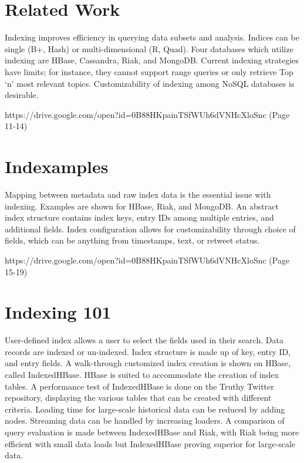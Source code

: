 \section{Related Work}

Indexing improves efficiency in querying data subsets and analysis.
Indices can be single (B+, Hash) or multi-dimensional (R, Quad). Four
databases which utilize indexing are HBase, Cassandra, Riak, and
MongoDB. Current indexing strategies have limits; for instance, they
cannot support range queries or only retrieve Top `n' most relevant
topics. Customizability of indexing among NoSQL databases is desirable.


{https://drive.google.com/open?id=0B88HKpainTSfWUh6dVNHcXloSnc
  (Page 11-14)}

\section{Indexamples}

Mapping between metadata and raw index data is the essential issue with
indexing. Examples are shown for HBase, Riak, and MongoDB. An abstract
index structure contains index keys, entry IDs among multiple entries,
and additional fields. Index configuration allows for customizability
through choice of fields, which can be anything from timestamps, text,
or retweet status.


{https://drive.google.com/open?id=0B88HKpainTSfWUh6dVNHcXloSnc
  (Page 15-19)}

\section{Indexing 101}

User-defined index allows a user to select the fields used in their
search. Data records are indexed or un-indexed. Index structure is made
up of key, entry ID, and entry fields. A walk-through customized index
creation is shown on HBase, called IndexedHBase. HBase is suited to
accommodate the creation of index tables. A performance test of
IndexedHBase is done on the Truthy Twitter repository, displaying the
various tables that can be created with different criteria. Loading time
for large-scale historical data can be reduced by adding nodes.
Streaming data can be handled by increasing loaders. A comparison of
query evaluation is made between IndexedHBase and Riak, with Riak being
more efficient with small data loads but IndexedHBase proving superior
for large-scale data.

